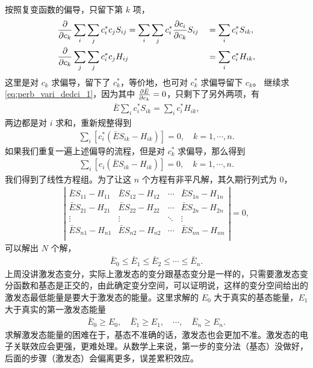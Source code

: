 按照复变函数的偏导，只留下第 $k$ 项，
\begin{alignat}{2}
    &\pdv{c_k} \sum_i \sum_j c_i^* c_j S_{ij} = \sum_i \sum_j c_i^* \pdv{c_i}{c_k} S_{ij} &&= \sum_i c_i^* S_{ik}, \\
    &\pdv{c_k} \sum_j \sum_j c_i^* c_j H_{ij} &&= \sum_i c_i^* H_{ik}, 
\end{alignat}
这里是对 $c_k$ 求偏导，留下了 $c_k^*$，等价地，也可对 $c_k^*$ 求偏导留下 $c_k$。
继续求 \eqref{eq:perb_vari_dedci_1}，因为其中 $\pdv{\bar E}{c_k} =0$，只剩下了另外两项，有
\begin{align}
    \bar E \sum_i c_i^* S_{ik} = \sum_i c_i^* H_{ik},
\end{align}
两边都是对 $i$ 求和，重新规整得到
\begin{align}
    \sum_i  [c_i^* \left(\bar E S_{ik} - H_{ik}\right)] = 0, \quad k = 1, \cdots, n. 
\end{align}
如果我们重复一遍上述偏导的流程，但是对 $c_k^*$ 求偏导，那么得到
\begin{align}
    \sum_i  [c_i \left(\bar E S_{ik} - H_{ik}\right)] = 0, \quad k = 1, \cdots, n. 
\end{align}
我们得到了线性方程组。为了让这 $n$ 个方程有非平凡解，其久期行列式为 0，
\begin{align}
    \left|
        \begin{matrix}
            \bar E S_{11} - H_{11} & \bar E S_{12} - H_{12} & \cdots & \bar E S_{1n} - H_{1n} \\
            \bar E S_{21} - H_{21} & \bar E S_{22} - H_{22} & \cdots & \bar E S_{2n} - H_{2n} \\
            \vdots & \vdots & \ddots & \vdots \\
            \bar E S_{n1} - H_{n1} & \bar E S_{n2} - H_{n2} & \cdots & \bar E S_{nn} - H_{nn} \\
        \end{matrix}
    \right| = 0,
\end{align}
可以解出 $N$ 个解，
\begin{align}
    \bar E_0 \leqslant \bar E_1 \leqslant \bar E_2 \leqslant \cdots \leqslant \bar E_n. 
\end{align}
上周没讲激发态变分，实际上激发态的变分跟基态变分是一样的，只需要激发态变分函数和基态是正交的，由此确定变分空间，可以证明说，这样的变分空间给出的激发态最低能量是要大于激发态的能量。这里求解的 $E_0$ 大于真实的基态能量，$E_1$ 大于真实的第一激发态能量
\begin{align}
    \bar E_0 \geqslant E_0, \quad \bar E_1 \geqslant E_1, \quad \cdots, \quad \bar E_n \geqslant E_n. 
\end{align}
求解激发态能量的困难在于，基态不准确的话，激发态也会更加不准。激发态的电子关联效应会更强，更难处理。从数学上来说，第一步的变分法（基态）没做好，后面的步骤（激发态）会偏离更多，误差累积效应。

